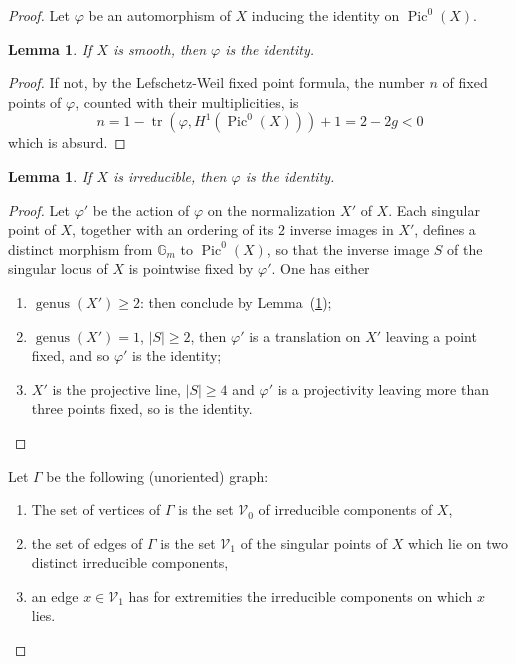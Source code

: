 \documentclass[10pt]{amsart}
\theoremstyle{plain}
\newtheorem{lemma}[theorem]{Lemma}
\theoremstyle{definition}
\DeclareMathOperator{\Pic}{Pic}
\DeclareMathOperator{\tr}{tr}
\DeclareMathOperator{\genus}{genus}
\begin{document}
\begin{proof}
Let $\varphi$ be an automorphism of $X$ inducing the identity on $\Pic^0(X)$.

\begin{lemma}\label{lem:1.14}
If $X$ is smooth, then $\varphi$ is the identity.
\end{lemma}

\begin{proof}
If not, by the Lefschetz-Weil fixed point formula, the number $n$ of fixed points of $\varphi$, counted with their multiplicities, is
\[
n = 1 - \tr(\varphi, H^1(\Pic^0(X))) + 1 = 2 - 2g < 0
\]
which is absurd.
\end{proof}

\begin{lemma}\label{lem:1.15}
If $X$ is irreducible, then $\varphi$ is the identity.
\end{lemma}

\begin{proof}
Let $\varphi'$ be the action of $\varphi$ on the normalization $X'$ of $X$. Each singular point of $X$, together with an ordering of its $2$ inverse images in $X'$, defines a distinct morphism from $\mathbb{G}_m$ to $\Pic^0(X)$, so that the inverse image $S$ of the singular locus of $X$ is pointwise fixed by $\varphi'$. One has either
\begin{enumerate}
\item[a)] $\genus(X') \geq 2$: then conclude by Lemma~(\ref{lem:1.14});
\item[b)] $\genus(X') = 1$, $|S| \geq 2$, then $\varphi'$ is a translation on $X'$ leaving a point fixed, and so $\varphi'$ is the identity;
\item[c)] $X'$ is the projective line, $|S| \geq 4$ and $\varphi'$ is a projectivity leaving more than three points fixed, so is the identity.
\end{enumerate}
\end{proof}

Let $\Gamma$ be the following (unoriented) graph:
\begin{enumerate}
\item[(i)] The set of vertices of $\Gamma$ is the set $\mathcal{V}_0$ of irreducible components of $X$,
\item[(ii)] the set of edges of $\Gamma$ is the set $\mathcal{V}_1$ of the singular points of $X$ which lie on two distinct irreducible components,
\item[(iii)] an edge $x \in \mathcal{V}_1$ has for extremities the irreducible components on which $x$ lies.
\end{enumerate}


\end{proof}
\end{document}
